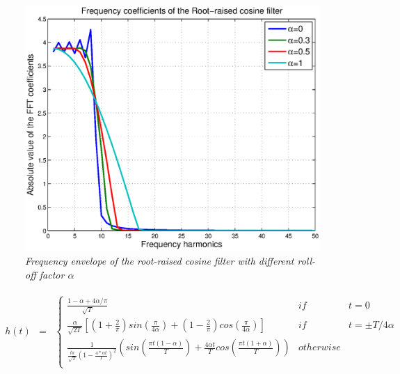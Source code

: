 \begin{figure}[H]
\centering
\includegraphics[width=0.9\columnwidth]{RRC_freq.eps}
\caption{\textit{Frequency envelope of the root-raised cosine filter with different roll-off factor $\alpha$}} \label{fg_4}
\end{figure}
\begin{align}
\begin{matrix}
h(t) &=& \left\{ \begin{matrix} 
\frac{1-\alpha +4\alpha/\pi}{\sqrt{T}}& if& t=0\\
\frac{\alpha}{\sqrt{2T}}[(1+\frac{2}{\pi})sin(\frac{\pi}{4\alpha})+(1-\frac{2}{\pi})cos(\frac{\pi}{4\alpha})] & if &t= \pm T/4\alpha\\
\frac{1}{\frac{t\pi}{\sqrt{T}}(1-\frac{4*\alpha t}{T})^2}(sin(\frac{\pi t (1-\alpha)}{T})+\frac{4\alpha t}{T} cos(\frac{\pi t (1+ \alpha)}{T}) ) &otherwise \\
\end{matrix} \right.
\end{matrix}
\label{g_2}
\end{align}

